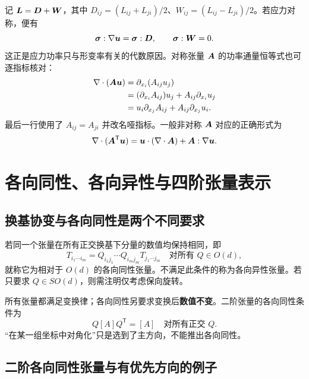 记 $\bm{L}=\bm{D}+\bm{W}$，其中 $D_{ij}=(L_{ij}+L_{ji})/2$、$W_{ij}=(L_{ij}-L_{ji})/2$。若应力对称，便有
\begin{equation}
 \bm{\sigma}:\nabla\bm{u}=\bm{\sigma}:\bm{D},
 \qquad \bm{\sigma}:\bm{W}=0.
\end{equation}
这正是应力功率只与形变率有关的代数原因。对称张量 $\bm{A}$ 的功率通量恒等式也可逐指标核对：
\begin{align}
 \nabla\cdot(\bm{A}\bm{u})
 &=\partial_{x_i}(A_{ij}u_j)\\
 &=(\partial_{x_i}A_{ij})u_j+A_{ij}\partial_{x_i}u_j\\
 &=u_i\partial_{x_j}A_{ij}+A_{ij}\partial_{x_j}u_i.
\end{align}
最后一行使用了 $A_{ij}=A_{ji}$ 并改名哑指标。一般非对称 $\bm{A}$ 对应的正确形式为
\begin{equation}
 \nabla\cdot(\bm{A}^{\mathsf T}\bm{u})
 =\bm{u}\cdot(\nabla\cdot\bm{A})+\bm{A}:\nabla\bm{u}.
\end{equation}

\section{各向同性、各向异性与四阶张量表示}\label{sec:tensor-isotropy}

\subsection{换基协变与各向同性是两个不同要求}

\begin{definition}[各向同性张量]
若同一个张量在所有正交换基下分量的数值均保持相同，即
\begin{equation}
 T_{i_1\cdots i_m}
 =Q_{i_1j_1}\cdots Q_{i_mj_m}T_{j_1\cdots j_m}
 \quad\text{对所有 }Q\in O(d),
\end{equation}
就称它为相对于 $O(d)$ 的各向同性张量。不满足此条件的称为各向异性张量。若只要求 $Q\in SO(d)$，则需注明仅考虑保向旋转。
\end{definition}

所有张量都满足变换律；各向同性另要求变换后\textbf{数值不变}。二阶张量的各向同性条件为
\begin{equation}
 Q[A]Q^{\mathsf T}=[A]\quad\text{对所有正交 }Q.
\end{equation}
“在某一组坐标中对角化”只是选到了主方向，不能推出各向同性。

\subsection{二阶各向同性张量与有优先方向的例子}

